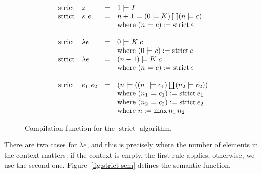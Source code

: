 \documentclass[conference]{IEEEtran}
\DeclareMathOperator{\strict}{strict}
\begin{document}
\begin{figure}
    \begin{equation*}
        \begin{array}{l l l l}
            \strict & z         & = & 1 \models I                                              \\
            \strict & s \ e     & = & n+1 \models (0 \models K) \coprod (n \models c)          \\
                    &           &   & \text{where } (n \models c) := \strict e                 \\
            \\
            \strict & \lambda e & = & 0 \models K \; c                                         \\
                    &           &   & \text{where } (0 \models c) := \strict e                 \\
            \strict & \lambda e & = & (n-1) \models K \; c                                     \\
                    &           &   & \text{where } (n \models c) := \strict e                 \\
            \\
            \strict & e_1 \ e_2 & = & (n \models ((n_1 \models c_1) \coprod (n_2 \models c_2)) \\
                    &           &   & \text{where } (n_1 \models c_1) := \strict e_1           \\
                    &           &   & \text{where } (n_2 \models c_2) := \strict e_2           \\
                    &           &   & \text{where } n := \max n_1 \, n_2                       \\
        \end{array}
    \end{equation*}
    \centering
    \caption{Compilation function for the $\strict$ algorithm.}
    \label{fig:strict}
\end{figure}

There are two cases for $\lambda e$, and this is precisely where the number of elements in the context matters:
if the context is empty, the first rule applies, otherwise, we use the second one.
Figure~\ref{fig:strict-sem} defines the semantic function.
\end{document}
